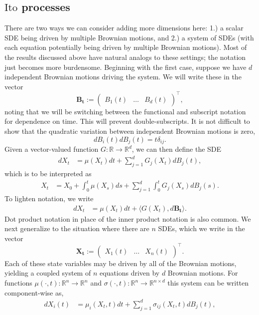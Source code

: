 \documentclass[12pt]{article}
\newcommand{\B}[1]{\boldsymbol{#1}}
\newcommand{\R}{\mathbb{R}}
\newcommand{\state}[1][t]{X_{#1}}
\newcommand{\BM}[1][t]{B_{#1}} %
\newcommand{\ito}{\text{It}\hat{\text{o}}}
\newcommand{\dimBM}{d} %
\newcommand{\dimState}{n}
\begin{document}
\subsection{$\ito$ processes}
There are two ways we can consider adding more dimensions here: 1.) a scalar SDE being driven by multiple Brownian motions, and 
2.) a system of SDEs (with each equation potentially being driven by multiple Brownian motions). Most of the results discussed above have 
natural analogs to these settings; the notation just becomes more burdensome. Beginning with the first case, suppose we have 
$\dimBM$ independent Brownian motions driving the system. We will write these in the vector 
\[
\B\BM := \begin{pmatrix} \BM[1](t) & \dots & \BM[\dimBM](t) \end{pmatrix}^\top,
\]
noting that we will be switching between the functional and subscript notation for dependence on time. This will prevent double-subscripts. 
It is not difficult to  show that the quadratic variation between independent Brownian motions is zero, 
\[
d\BM[i](t) d\BM[j](t) = t \delta_{ij}. 
\]
Given a vector-valued function $G: \R \to \R^{\dimBM}$, we can then define the SDE
\begin{align*}
d\state &= \mu(\state) dt + \sum_{j=1}^{\dimBM} G_j(\state) d\BM[j](t), 
\end{align*}
which is to be interpreted as 
\begin{align*}
\state &= \state[0] + \int_{0}^{t} \mu(\state[s]) ds + \sum_{j=1}^{\dimBM} \int_{0}^{t} G_j(\state[s]) d\BM[j](s).
\end{align*}
To lighten notation, we write 
\begin{align*}
d\state &= \mu(\state) dt + \langle G(\state), d\B\BM \rangle.
\end{align*}
Dot product notation in place of the inner product notation is also common. We next generalize to the situation where there are $\dimState$ 
SDEs, which we write in the vector
\[
\B\state := \begin{pmatrix} \state[1](t) & \dots & \state[\dimState](t) \end{pmatrix}^\top.
\]
Each of these state variables may be driven by all of the Brownian motions, yielding a coupled system of $\dimState$ equations
driven by $\dimBM$ Brownian motions. For functions $\mu(\cdot, t): \R^{\dimState} \to \R^{\dimState}$ and $\sigma(\cdot, t): \R^{\dimState} \to \R^{\dimState \times \dimBM}$ this
 system can be written component-wise as,
\begin{align*}
d\state[i](t) &= \mu_i(\state,t) dt + \sum_{j=1}^{\dimBM} \sigma_{ij}(\state,t) d\BM[j](t), 
\end{align*}
\end{document}
